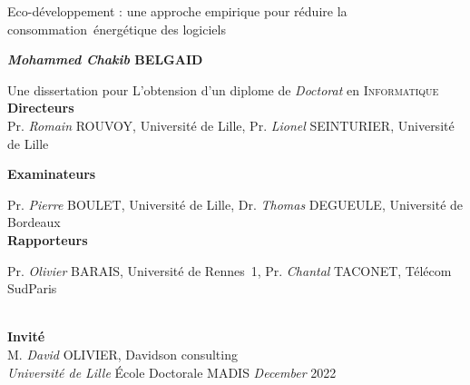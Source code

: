 \begin{center}
    \LARGE
    Eco-développement : une approche empirique pour réduire la consommation~énergétique des logiciels

    \vspace{.8cm}
    \Large
    \textbf{\emph{Mohammed Chakib} \textsc{BELGAID}}
    \vspace{0.8cm}
    \large

    Une dissertation pour L'obtension d'un diplome de \emph{Doctorat} en \textsc{Informatique}  \\

    \large
    \textbf{Directeurs}\\
    \RaggedRight
    \vspace{.5cm}
    \normalsize
    Pr. \emph{Romain} \textsc{ROUVOY}, Université de Lille,\newline
    Pr. \emph{Lionel} \textsc{SEINTURIER}, Université de Lille
    \endminipage
    \vspace{0.6cm}

    \large
    \textbf{Examinateurs}\\
    \normalsize

    \vspace{.5cm}


    Pr. \emph{Pierre} \textsc{BOULET}, Université de Lille,\newline
    Dr. \emph{Thomas} \textsc{DEGUEULE}, Université de Bordeaux
    \endminipage
    \vspace{.5cm}
    \\
    \large
    \textbf{Rapporteurs}\\

    \vspace{.5cm}
    \normalsize
    Pr. \emph{Olivier} \textsc{BARAIS}, Université de Rennes~1,\newline
    Pr. \emph{Chantal} \textsc{TACONET}, Télécom SudParis

    \endminipage
    \vspace{0.6cm}
    \\
    \large
    \textbf{Invité}\\
    \normalsize
    \vspace{.5cm}
    M. \emph{David} OLIVIER, Davidson consulting
    \endminipage
    \vspace{0.8cm}
    \\
    \large
    \emph{Université de Lille}
    \'Ecole Doctorale MADIS
    \endminipage
    \emph{December} 2022
    \endminipage



\end{center}